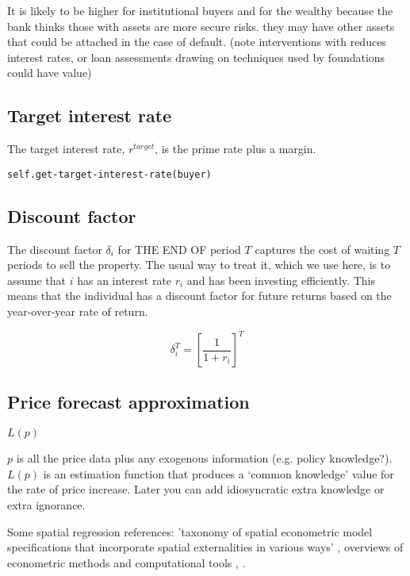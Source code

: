 It is likely to be higher for institutional buyers  and for the wealthy because the bank thinks those with assets are more secure risks. they may have other assets that could be attached in the case of default.
(note interventions with reduces interest rates, or loan assessments drawing on techniques used by foundations could have value)


\subsection{Target interest rate}\label{SS:targetr}

 The target interest rate, $r^{target}$, is the prime rate plus a margin. %

\begin{verbatim}
self.get-target-interest-rate(buyer)
\end{verbatim}



\subsection{Discount factor}\label{SS:discountfactor}

The discount factor $\delta_i$ for THE END OF period $T$ captures the cost of waiting $T$ periods to sell the property. The usual way to treat it, which we use here, is to assume that $i$ has an interest rate $r_i$ and has been investing efficiently. This means that  the individual has a discount factor for future returns based on the year-over-year rate of return. 

\[\delta^T_i=\left[\frac{1}{1+r_i}\right]^T\]



\subsection{Price forecast approximation} \label{SS:PriceForecast}
$L(p)$

$p$ is all the price data plus any exogenous information (e.g. policy knowledge?). $L(p)$ is an estimation function that produces a `common knowledge' value for the rate of price increase. Later you can add idiosyncratic extra knowledge or extra ignorance.

Some spatial regression references:
'taxonomy of spatial econometric model specifications that incorporate spatial externalities in various ways'
\cite{anselinSpatialExternalitiesSpatial2003},  
overviews of econometric methods and computational tools \cite{anselinModernSpatialEconometrics2014}, \cite{gelmanDataAnalysisUsing2006}.


